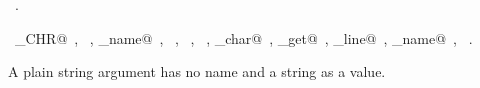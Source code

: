 \documentclass[a4paper]{report}
\begin{document}
\begin{flushleft}
\begin{minipage}{\linewidth}
\begin{list}{}{}
\mbox{}\verb@  }@\\
\mbox{}\verb@}@{\NWsep}
\end{list}
\vspace{-1.5ex}
\footnotesize
\begin{list}{}{\setlength{\itemsep}{-\parsep}\setlength{\itemindent}{-\leftmargin}}
\item \NWtxtMacroRefIn\ .
\item \NWtxtIdentsUsed\nobreak\  \verb@ARG_CHR@\nobreak\ , \verb@buildArglist@\nobreak\ , \verb@command_name@\nobreak\ , \verb@exit@\nobreak\ , \verb@fprintf@\nobreak\ , \verb@Name@\nobreak\ , \verb@nw_char@\nobreak\ , \verb@source_get@\nobreak\ , \verb@source_line@\nobreak\ , \verb@source_name@\nobreak\ , \verb@stderr@\nobreak\ .
\item{}
\end{list}
\end{minipage}\vspace{4ex}
\end{flushleft}
A plain string argument has no name and a string as a value.
\end{document}

